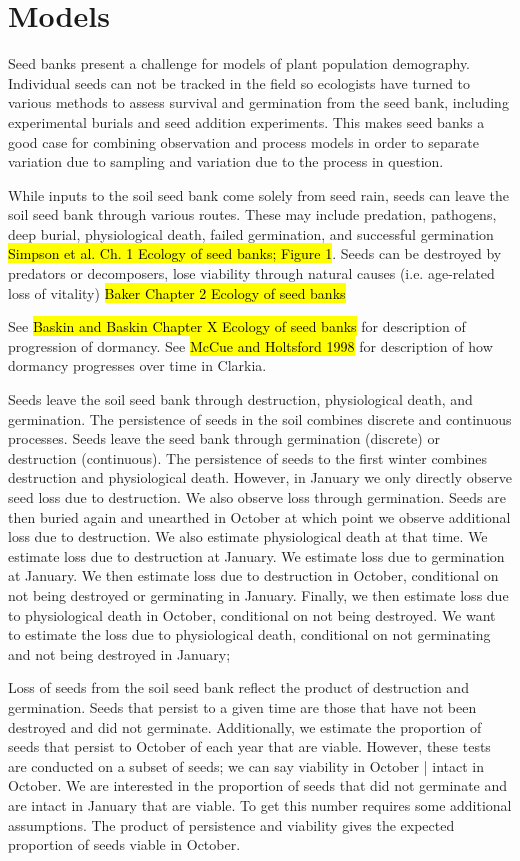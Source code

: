 \documentclass[12pt, oneside, titlepage]{article}   	%
\begin{document}
\section{Models}

Seed banks present a challenge for models of plant population demography. Individual seeds can not be tracked in the field so ecologists have turned to various methods to assess survival and germination from the seed bank, including experimental burials and seed addition experiments. This makes seed banks a good case for combining observation and process models in order to separate variation due to sampling and variation due to the process in question. 


While inputs to the soil seed bank come solely from seed rain, seeds can leave the soil seed bank through various routes. These may include predation, pathogens, deep burial, physiological death, failed germination, and successful germination \hl{Simpson et al. Ch. 1 Ecology of seed banks; Figure 1}. Seeds can be destroyed by predators or decomposers, lose viability through natural causes (i.e. age-related loss of vitality) \hl{Baker Chapter 2 Ecology of seed banks}

See \hl{Baskin and Baskin Chapter X Ecology of seed banks} for description of progression of dormancy. See \hl{McCue and Holtsford 1998} for description of how dormancy progresses over time in Clarkia.

Seeds leave the soil seed bank through destruction, physiological death, and germination. The persistence of seeds in the soil combines discrete and continuous processes. Seeds leave the seed bank through germination (discrete) or destruction (continuous). The persistence of seeds to the first winter combines destruction and physiological death. However, in January we only directly observe seed loss due to destruction. We also observe loss through germination. Seeds are then buried again and unearthed in October at which point we observe additional loss due to destruction. We also estimate physiological death at that time. We estimate loss due to destruction at January. We estimate loss due to germination at January. We then estimate loss due to destruction in October, conditional on not being destroyed or germinating in January. Finally, we then estimate loss due to physiological death in October, conditional on not being destroyed. We want to estimate the loss due to physiological death, conditional on not germinating and not being destroyed in January;

Loss of seeds from the soil seed bank reflect the product of destruction and germination. Seeds that persist to a given time are those that have not been destroyed and did not germinate. Additionally, we estimate the proportion of seeds that persist to October of each year that are viable. However, these tests are conducted on a subset of seeds; we can say viability in October | intact in October. We are interested in the proportion of seeds that did not germinate and are intact in January that are viable. To get this number requires some additional assumptions. The product of persistence and viability gives the expected proportion of seeds viable in October. 
\end{document}
